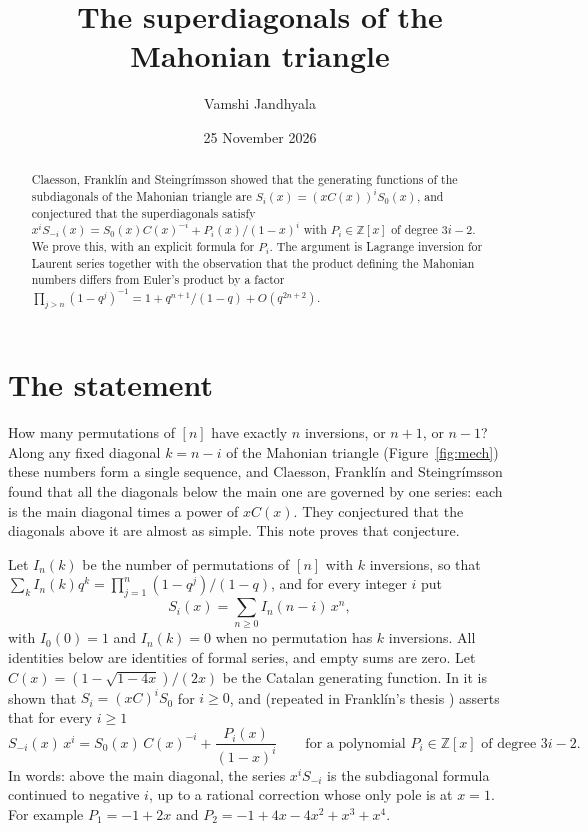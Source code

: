 \documentclass[11pt]{amsart}
\title{The superdiagonals of the Mahonian triangle}
\author{Vamshi Jandhyala}
\date{25 November 2026}
\theoremstyle{remark}\newtheorem*{remark}{Remark}
\begin{document}
\begin{abstract}
Claesson, Frankl\'in and Steingr\'imsson showed that the generating functions of the subdiagonals of the Mahonian
triangle are $S_i(x)=(xC(x))^iS_0(x)$, and conjectured that the superdiagonals satisfy
$x^iS_{-i}(x)=S_0(x)C(x)^{-i}+P_i(x)/(1-x)^i$ with $P_i\in\mathbb Z[x]$ of degree $3i-2$. We prove this, with an
explicit formula for $P_i$. The argument is Lagrange inversion for Laurent series together with the observation that
the product defining the Mahonian numbers differs from Euler's product by a factor
$\prod_{j>n}(1-q^j)^{-1}=1+q^{n+1}/(1-q)+O(q^{2n+2})$.
\end{abstract}
\maketitle

\section{The statement}
How many permutations of $[n]$ have exactly $n$ inversions, or $n+1$, or $n-1$? Along any fixed diagonal $k=n-i$ of
the Mahonian triangle (Figure~\ref{fig:mech}) these numbers form a single sequence, and Claesson, Frankl\'in and
Steingr\'imsson \cite{CFS} found that all the diagonals below the main one are governed by one series: each is the
main diagonal times a power of $xC(x)$. They conjectured that the diagonals above it are almost as simple. This note
proves that conjecture.

Let $I_n(k)$ be the number of permutations of $[n]$ with $k$ inversions, so that
$\sum_k I_n(k)q^k=\prod_{j=1}^{n}(1-q^j)/(1-q)$, and for every integer $i$ put
\[
S_i(x)=\sum_{n\ge0}I_n(n-i)\,x^n ,
\]
with $I_0(0)=1$ and $I_n(k)=0$ when no permutation has $k$ inversions. All identities below are identities of formal
series, and empty sums are zero.
Let $C(x)=(1-\sqrt{1-4x})/(2x)$ be the Catalan generating function. In \cite[Theorem~3]{CFS} it is shown that
$S_i=(xC)^iS_0$ for $i\ge0$, and \cite[Conjecture~15]{CFS} (repeated in Frankl\'in's thesis \cite{F}) asserts that for
every $i\ge1$
\[
S_{-i}(x)\,x^i=S_0(x)\,C(x)^{-i}+\frac{P_i(x)}{(1-x)^i}
\qquad\text{for a polynomial }P_i\in\mathbb Z[x]\text{ of degree }3i-2 .
\tag{1}
\]
In words: above the main diagonal, the series $x^iS_{-i}$ is the subdiagonal formula continued to negative $i$, up to
a rational correction whose only pole is at $x=1$. For example $P_1=-1+2x$ and $P_2=-1+4x-4x^2+x^3+x^4$.
\end{document}
